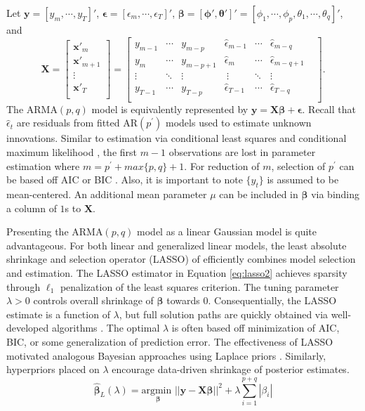 Let $\bm{y}=[y_{m},\cdots,y_T]'$, $\bm{\epsilon}=[\epsilon_{m},\cdots,\epsilon_T]'$, $\bm{\beta}=[\bm{\phi}',\bm{\theta}']'=[\phi_1,\cdots,\phi_p,\theta_1,\cdots,\theta_q]'$, and 
\begin{equation*}
\bm{X}=\begin{bmatrix} \bm{x}'_{m}  \\
					\bm{x}'_{m+1}  \\
					\vdots \\
					\bm{x}'_{T} \\
	\end{bmatrix} =
	\begin{bmatrix} y_{m-1} & \cdots & y_{m-p} &
					\hat{\epsilon}_{m-1} & \cdots & \hat{\epsilon}_{m-q} \\
					y_{m} & \cdots & y_{m-p+1} &
					\hat{\epsilon}_{m} & \cdots & \hat{\epsilon}_{m-q+1} \\
					\vdots & \ddots & \vdots &\
					\vdots & \ddots & \vdots & \\
					y_{T-1} & \cdots & y_{T-p} &
					\hat{\epsilon}_{T-1} & \cdots & \hat{\epsilon}_{T-q} \\
	\end{bmatrix}.
\end{equation*}
The ARMA$(p,q)$ model is equivalently represented by $\bm{y}=\bm{X}\bm{\beta}+\bm{\epsilon}$. Recall that $\hat{\epsilon}_t$ are residuals from fitted AR$(p^\prime)$ models used to estimate unknown innovations. Similar to estimation via conditional least squares and conditional maximum likelihood \citep{Hamilton1994}, the first $m-1$ observations are lost in parameter estimation where $m=p^\prime+max\{p,q\}+1$. For reduction of $m$, selection of $p^\prime$ can be based off AIC or BIC  \citep{Hannan1984a,Chen2011}. Also, it is important to note $\{y_t\}$ is assumed to be mean-centered. An additional mean parameter $\mu$ can be included in $\bm{\beta}$ via  binding a column of $1$s to $\bm{X}$.

Presenting the ARMA$(p,q)$ model as a linear Gaussian model is quite advantageous. For both linear and generalized linear models, the least absolute shrinkage and selection operator (LASSO) of \cite{Tibshirani1996} efficiently combines model selection and estimation. The LASSO estimator in Equation \ref{eq:lasso2} achieves sparsity through $\ell_1$ penalization of the least squares criterion.  The tuning parameter $\lambda >0$ controls overall shrinkage of $\bm{\beta}$ towards 0. Consequentially, the LASSO estimate is a function of $\lambda$, but full solution paths are quickly obtained via well-developed algorithms \citep{Efron2004}. The optimal $\lambda$ is often based off minimization of AIC, BIC, or some generalization of prediction error. The effectiveness of LASSO motivated analogous Bayesian approaches using Laplace priors \citep{Park2008, Yuan2005}. Similarly, hyperpriors placed on $\lambda$ encourage data-driven shrinkage of posterior estimates.
\begin{equation}
\label{eq:lasso2}
\hat{\bm{\beta}}_{L} (\lambda)= \underset{\bm{\beta}}{\textrm{argmin }}  ||\bm{y}-\bm{X}\bm{\beta}||^2 + \lambda \sum\limits_{i=1}^{p+q}|\beta_i|
\end{equation}

